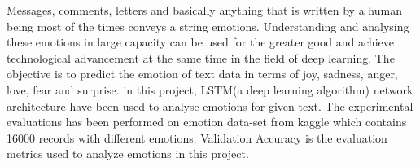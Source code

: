 Messages, comments, letters and basically anything that is written by a human being most of the times conveys a string emotions. Understanding and analysing these emotions in large capacity can be used for the greater good and achieve technological advancement at the same time in the field of deep learning. The objective is to predict the emotion of text data in terms of joy, sadness, anger, love, fear and surprise. in this project, LSTM(a deep learning algorithm) network architecture have been used to analyse emotions for given text. The experimental evaluations has been performed on emotion data-set from kaggle which contains 16000 records with different emotions. Validation Accuracy is the evaluation metrics used to analyze emotions in this project.
\endinput
